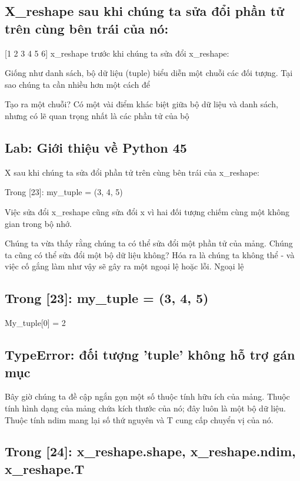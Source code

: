 \subsection{X\_reshape sau khi chúng ta sửa đổi phần tử trên cùng bên trái của nó:}

[1 2 3 4 5 6] x\_reshape trước khi chúng ta sửa đổi x\_reshape:

Giống như danh sách, bộ dữ liệu (tuple) biểu diễn một chuỗi các đối tượng. Tại sao chúng ta cần nhiều hơn một cách để

Tạo ra một chuỗi? Có một vài điểm khác biệt giữa bộ dữ liệu và danh sách, nhưng có lẽ quan trọng nhất là các phần tử của bộ

\subsection{Lab: Giới thiệu về Python 45}

X sau khi chúng ta sửa đổi phần tử trên cùng bên trái của x\_reshape:

Trong [23]: my\_tuple = (3, 4, 5)

Việc sửa đổi x\_reshape cũng sửa đổi x vì hai đối tượng chiếm cùng một không gian trong bộ nhớ.

Chúng ta vừa thấy rằng chúng ta có thể sửa đổi một phần tử của mảng. Chúng ta cũng có thể sửa đổi một bộ dữ liệu không? Hóa ra là chúng ta không thể - và việc cố gắng làm như vậy sẽ gây ra một ngoại lệ hoặc lỗi. Ngoại lệ

\subsection{Trong [23]: my\_tuple = (3, 4, 5)}

My\_tuple[0] = 2

\subsection{TypeError: đối tượng 'tuple' không hỗ trợ gán mục}

Bây giờ chúng ta đề cập ngắn gọn một số thuộc tính hữu ích của mảng. Thuộc tính hình dạng của mảng chứa kích thước của nó; đây luôn là một bộ dữ liệu. Thuộc tính ndim mang lại số thứ nguyên và T cung cấp chuyển vị của nó.

\subsection{Trong [24]: x\_reshape.shape, x\_reshape.ndim, x\_reshape.T}

